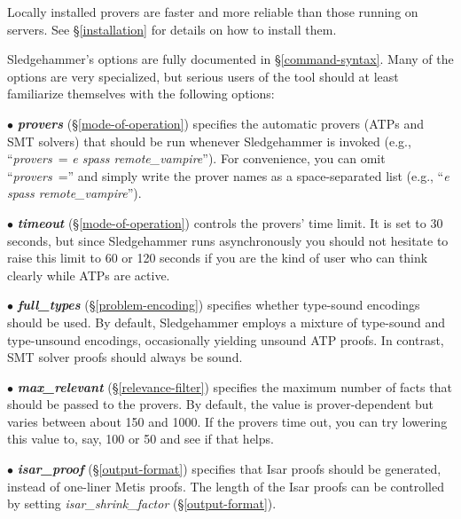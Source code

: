\documentclass[a4paper,12pt]{article}
\begin{document}

Locally installed provers are faster and more reliable than those running on
servers. See \S\ref{installation} for details on how to install them.


Sledgehammer's options are fully documented in \S\ref{command-syntax}. Many of
the options are very specialized, but serious users of the tool should at least
familiarize themselves with the following options:

\begin{enum}
\item[$\bullet$] \textbf{\textit{provers}} (\S\ref{mode-of-operation}) specifies
the automatic provers (ATPs and SMT solvers) that should be run whenever
Sledgehammer is invoked (e.g., ``\textit{provers}~= \textit{e spass
remote\_vampire}''). For convenience, you can omit ``\textit{provers}~=''
and simply write the prover names as a space-separated list (e.g., ``\textit{e
spass remote\_vampire}'').

\item[$\bullet$] \textbf{\textit{timeout}} (\S\ref{mode-of-operation}) controls
the provers' time limit. It is set to 30 seconds, but since Sledgehammer runs
asynchronously you should not hesitate to raise this limit to 60 or 120 seconds
if you are the kind of user who can think clearly while ATPs are active.

\item[$\bullet$] \textbf{\textit{full\_types}} (\S\ref{problem-encoding})
specifies whether type-sound encodings should be used. By default, Sledgehammer
employs a mixture of type-sound and type-unsound encodings, occasionally
yielding unsound ATP proofs. In contrast, SMT solver proofs should always be
sound.

\item[$\bullet$] \textbf{\textit{max\_relevant}} (\S\ref{relevance-filter})
specifies the maximum number of facts that should be passed to the provers. By
default, the value is prover-dependent but varies between about 150 and 1000. If
the provers time out, you can try lowering this value to, say, 100 or 50 and see
if that helps.

\item[$\bullet$] \textbf{\textit{isar\_proof}} (\S\ref{output-format}) specifies
that Isar proofs should be generated, instead of one-liner Metis proofs. The
length of the Isar proofs can be controlled by setting
\textit{isar\_shrink\_factor} (\S\ref{output-format}).
\end{enum}
\end{document}

